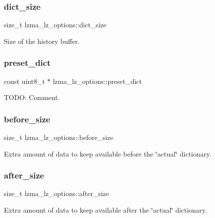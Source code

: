 \subsubsection{dict\+\_\+size}
{\footnotesize\ttfamily size\+\_\+t lzma\+\_\+lz\+\_\+options\+::dict\+\_\+size}



Size of the history buffer. 

\mbox{\label{structlzma__lz__options_a01750e9cb71e4ea7fc7c9518326af3ba}} 
\subsubsection{preset\+\_\+dict}
{\footnotesize\ttfamily const uint8\+\_\+t $\ast$ lzma\+\_\+lz\+\_\+options\+::preset\+\_\+dict}



T\+O\+DO\+: Comment. 

\mbox{\label{structlzma__lz__options_ac9ddbac2942fdffb60512d66331cb527}} 
\subsubsection{before\+\_\+size}
{\footnotesize\ttfamily size\+\_\+t lzma\+\_\+lz\+\_\+options\+::before\+\_\+size}

Extra amount of data to keep available before the \char`\"{}actual\char`\"{} dictionary. \mbox{\label{structlzma__lz__options_a0d3e130ba60fab1c0b682caa7abe15a7}} 
\subsubsection{after\+\_\+size}
{\footnotesize\ttfamily size\+\_\+t lzma\+\_\+lz\+\_\+options\+::after\+\_\+size}

Extra amount of data to keep available after the \char`\"{}actual\char`\"{} dictionary. \mbox{\label{structlzma__lz__options_a3923a9ac746074ec4cb3aacd8acd2771}} 
